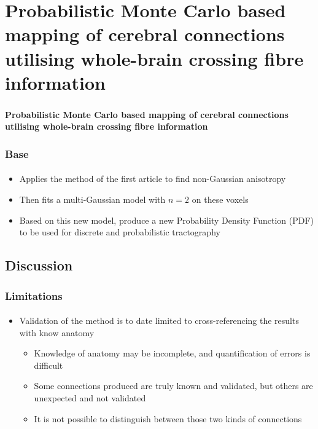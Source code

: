 \documentclass[10pt]{beamer}
\begin{document}
\section{Probabilistic Monte Carlo based mapping of cerebral connections utilising whole-brain crossing fibre information}
\begin{frame}
  \frametitle{}
  \framesubtitle{}

  \begin{Large}
  \begin{center}
  \textbf{Probabilistic Monte Carlo based mapping of cerebral connections utilising whole-brain crossing fibre information}
  \end{center}
  \end{Large}
\end{frame}

\begin{frame}
  \frametitle{Base}
  \framesubtitle{}

  \begin{itemize}
    \item Applies the method of the first article to find non-Gaussian anisotropy
    \item Then fits a multi-Gaussian model with $n=2$ on these voxels
    \item Based on this new model, produce a new Probability Density Function (PDF) to be used for discrete and probabilistic tractography
  \end{itemize}
\end{frame}

  \subsection{Discussion}
  \begin{frame}
    \frametitle{Limitations}
    \framesubtitle{}

    \begin{itemize}
      \item Validation of the method is to date limited to cross-referencing the results
with know anatomy
        \begin{itemize}
          \item Knowledge of anatomy may be incomplete, and quantification of errors is difficult
          \item Some connections produced are truly known and validated, but others are unexpected and not validated
          \item It is not possible to distinguish between those two kinds of connections
        \end{itemize}
    \end{itemize}
  \end{frame}
\end{document}
